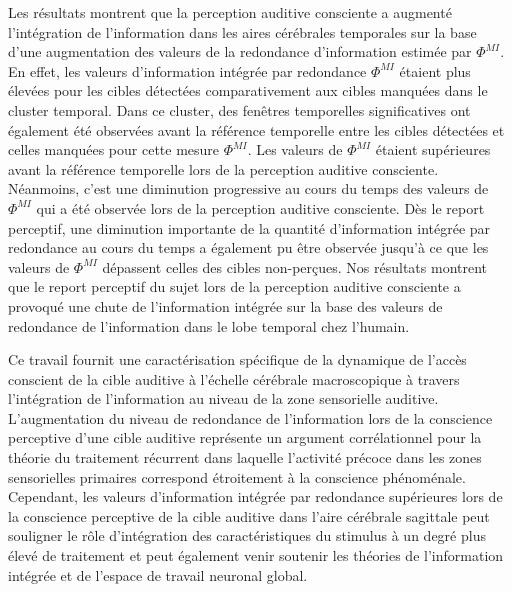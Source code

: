 Les résultats montrent que la perception auditive consciente a augmenté l'intégration de l'information dans les aires cérébrales temporales sur la base d'une augmentation des valeurs de la redondance d'information estimée par $\Phi^{MI}$. 
En effet, les valeurs d'information intégrée par redondance $\Phi^{MI}$ étaient plus élevées pour les cibles détectées comparativement aux cibles manquées dans le cluster temporal.
Dans ce cluster, des fenêtres temporelles significatives ont également été observées avant la référence temporelle entre les cibles détectées et celles manquées pour cette mesure $\Phi^{MI}$. 
Les valeurs de $\Phi^{MI}$ étaient supérieures avant la référence temporelle lors de la perception auditive consciente. 
Néanmoins, c'est une diminution progressive au cours du temps des valeurs de $\Phi^{MI}$ qui a été observée lors de la perception auditive consciente. 
Dès le report perceptif, une diminution importante de la quantité d'information intégrée par redondance au cours du temps a également pu être observée jusqu'à ce que les valeurs de $\Phi^{MI}$ dépassent celles des cibles non-perçues. 
Nos résultats montrent que le report perceptif du sujet lors de la perception auditive consciente a provoqué une chute de l'information intégrée sur la base des valeurs de redondance de l'information dans le lobe temporal chez l'humain. 

Ce travail fournit une caractérisation spécifique de la dynamique de l'accès conscient de la cible auditive à l'échelle cérébrale macroscopique à travers l'intégration de l'information au niveau de la zone sensorielle auditive. 
L'augmentation du niveau de redondance de l'information lors de la conscience perceptive d'une cible auditive représente un argument corrélationnel pour la théorie du traitement récurrent dans laquelle l'activité précoce dans les zones sensorielles primaires correspond étroitement à la conscience phénoménale. 
Cependant, les valeurs d'information intégrée par redondance supérieures lors de la conscience perceptive de la cible auditive dans l'aire cérébrale sagittale peut souligner le rôle d'intégration des caractéristiques du stimulus à un degré plus élevé de traitement et peut également venir soutenir les théories de l'information intégrée et de l'espace de travail neuronal global. 

